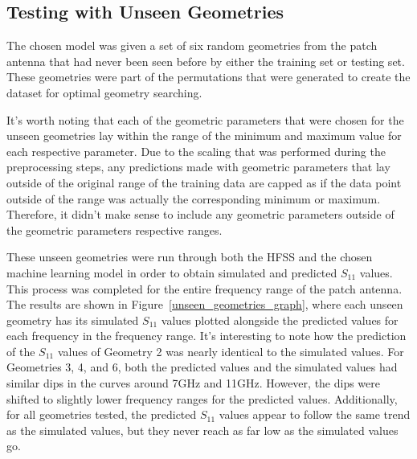 \documentclass[lettersize,journal]{IEEEtran}
\begin{document}
\subsection{Testing with Unseen Geometries}
The chosen model was given a set of six random geometries from the patch antenna that had never been seen before by either the training set or testing set. These geometries were part of the permutations that were generated to create the dataset for optimal geometry searching. 

It's worth noting that each of the geometric parameters that were chosen for the unseen geometries lay within the range of the minimum and maximum value for each respective parameter. Due to the scaling that was performed during the preprocessing steps, any predictions made with geometric parameters that lay outside of the original range of the training data are capped as if the data point outside of the range was actually the corresponding minimum or maximum. Therefore, it didn't make sense to include any geometric parameters outside of the geometric parameters respective ranges. 

These unseen geometries were run through both the HFSS and the chosen machine learning model in order to obtain simulated and predicted $S_{11}$ values. This process was completed for the entire frequency range of the patch antenna. The results are shown in Figure~\ref{unseen_geometries_graph}, where each unseen geometry has its simulated $S_{11}$ values plotted alongside the predicted values for each frequency in the frequency range. It's interesting to note how the prediction of the $S_{11}$ values of Geometry 2 was nearly identical to the simulated values. For Geometries 3, 4, and 6, both the predicted values and the simulated values had similar dips in the curves around 7GHz and 11GHz. However, the dips were shifted to slightly lower frequency ranges for the predicted values. Additionally, for all geometries tested, the predicted $S_{11}$ values appear to follow the same trend as the simulated values, but they never reach as far low as the simulated values go. 
\end{document}

